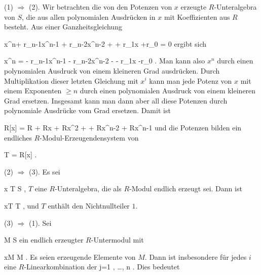 {





(1) $\Rightarrow$ (2). Wir betrachten die von den Potenzen von $x$ erzeugte $R$-Unteralgebra
 von $S$, die aus allen polynomialen Ausdrücken in $x$ mit Koeffizienten aus $R$ besteht. Aus einer Ganzheitsgleichung

\mavergleichskettedisp
{\vergleichskette
{ x^n+ r_{n-1}x^{n-1} + r_{n-2}x^{n-2} + \cdots +  r_1x +r_0
}
{ =} { 0
}
{ } {
}
{ } {
}
{ } {
}
}
{}{}{}
ergibt sich

\mavergleichskettedisp
{\vergleichskette
{ x^n
}
{ =} { - r_{n-1}x^{n-1} - r_{n-2}x^{n-2} - \cdots -  r_1x -r_0
}
{ } {
}
{ } {
}
{ } {
}
}
{}{}{.}
Man kann also $x^n$ durch einen polynomialen Ausdruck von einem kleineren Grad ausdrücken. Durch Multiplikation dieser letzten Gleichung mit $x^{i}$ kann man jede Potenz von $x$ mit einem Exponenten $\geq n$ durch einen polynomialen Ausdruck von einem kleineren Grad ersetzen. Insgesamt kann man dann aber all diese Potenzen durch polynomiale Ausdrücke vom Grad
 ersetzen. Damit ist

\mavergleichskettedisp
{\vergleichskette
{ R[x]
}
{ =} { R + Rx + Rx^2 + \cdots +  Rx^{n-2} + Rx^{n-1}
}
{ } {
}
{ } {
}
{ } {
}
}
{}{}{}
und die Potenzen
 bilden ein endliches $R$-Modul-Erzeugendensystem von

\mavergleichskette
{\vergleichskette
{T
}
{ = }{ R[x]
}
{  }{
}
{    }{
}
{   }{
}
}
{}{}{.}

(2) $\Rightarrow$ (3). Es sei

\mavergleichskette
{\vergleichskette
{ x
}
{ \in }{ T
}
{ \subseteq }{ S
}
{    }{
}
{   }{
}
}
{}{}{,}
$T$ eine $R$-Unteralgebra, die als $R$-Modul endlich erzeugt sei. Dann ist

\mavergleichskette
{\vergleichskette
{ xT
}
{ \subseteq }{ T
}
{  }{
}
{    }{
}
{   }{
}
}
{}{}{,}
und $T$ enthält den Nichtnullteiler $1$.

(3) $\Rightarrow$ (1). Sei

\mavergleichskette
{\vergleichskette
{M
}
{ \subseteq }{ S
}
{  }{
}
{    }{
}
{   }{
}
}
{}{}{}
ein endlich erzeugter $R$-Untermodul mit

\mavergleichskette
{\vergleichskette
{ xM
}
{ \subseteq }{ M
}
{  }{
}
{    }{
}
{   }{
}
}
{}{}{.}
Es seien
 erzeugende Elemente von $M$. Dann ist insbesondere
 für jedes $i$ eine $R$-Linearkombination der  { j=1 , \ldots , n   }{.} Dies bedeutet

}
